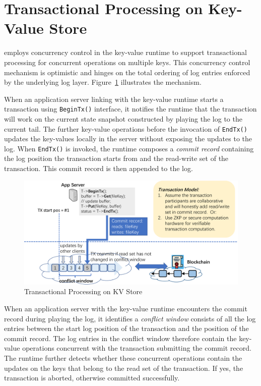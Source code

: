 \section{Transactional Processing on Key-Value Store}

\project employs concurrency control in the key-value runtime to support transactional processing for concurrent operations on multiple keys. 
This concurrency control mechanism is optimistic and hinges on the total ordering of log entries enforced by the underlying log layer. 
Figure~\ref{fig:tx} illustrates the mechanism.

When an application server linking with the \project key-value runtime starts a transaction using \texttt{BeginTx()} interface, it notifies the runtime that the transaction will work on the current state snapshot constructed by playing the log to the current tail.
The further key-value operations before the invocation of \texttt{EndTx()} updates the key-values locally in the server without exposing the updates to the log. 
When \texttt{EndTx()} is invoked, the runtime composes a \emph{commit record} containing the log position the transaction starts from and the read-write set of the transaction.  
This commit record is then appended to the log.

\begin{figure}[H]	
	\includegraphics[width=\textwidth]{figure/tx-crop.pdf}
	\caption{Transactional Processing on \project KV Store}
	\label{fig:tx}
\end{figure}
 
When an application server with the key-value runtime encounters the commit record during playing the log, it identifies a \emph{conflict window} consists of all the log entries between the start log position of the transaction and the position of the commit record. 
The log entries in the conflict window therefore contain the key-value operations concurrent with the transaction submitting the commit record. 
The runtime further detects whether these concurrent operations contain the updates on the keys that belong to the read set of the transaction.
If yes, the transaction is aborted, otherwise committed successfully.

